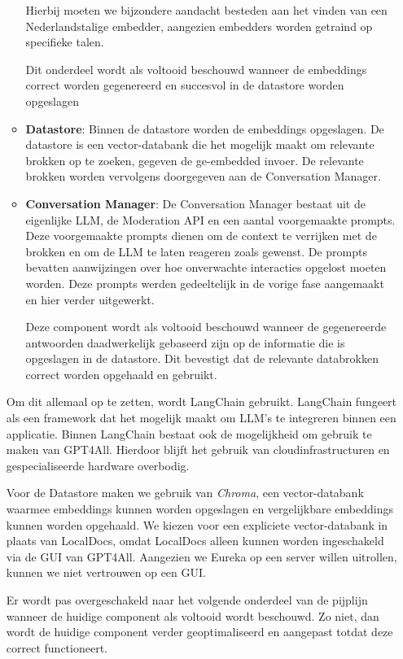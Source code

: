 \begin{enumerate}
\begin{itemize}
        Hierbij moeten we bijzondere aandacht besteden aan het vinden van een Nederlandstalige embedder, aangezien embedders worden getraind op specifieke talen.

        Dit onderdeel wordt als voltooid beschouwd wanneer de embeddings correct worden gegenereerd en succesvol in de datastore worden opgeslagen
        \item \textbf{Datastore}: Binnen de datastore worden de embeddings opgeslagen. De datastore is een vector-databank die het mogelijk maakt om relevante brokken op te zoeken, gegeven de ge-embedded invoer. De relevante brokken worden vervolgens doorgegeven aan de Conversation Manager. 
        \item \textbf{Conversation Manager}: De Conversation Manager bestaat uit de eigenlijke \acrshort{LLM}, de Moderation API en een aantal voorgemaakte prompts. Deze voorgemaakte prompts dienen om de context te verrijken met de brokken en om de \acrshort{LLM} te laten reageren zoals gewenst. De prompts bevatten aanwijzingen over hoe onverwachte interacties opgelost moeten worden. Deze prompts werden gedeeltelijk in de vorige fase aangemaakt en hier verder uitgewerkt. 
        
        Deze component wordt als voltooid beschouwd wanneer de gegenereerde antwoorden daadwerkelijk gebaseerd zijn op de informatie die is opgeslagen in de datastore. Dit bevestigt dat de relevante databrokken correct worden opgehaald en gebruikt.
    \end{itemize}
    
    Om dit allemaal op te zetten, wordt LangChain gebruikt. LangChain fungeert als een framework dat het mogelijk maakt om \acrshort{LLM}’s te integreren binnen een applicatie. Binnen LangChain bestaat ook de mogelijkheid om gebruik te maken van GPT4All. Hierdoor blijft het gebruik van cloudinfrastructuren en gespecialiseerde hardware overbodig.
    
    Voor de Datastore maken we gebruik van \textit{Chroma}, een vector-databank waarmee embeddings kunnen worden opgeslagen en vergelijkbare embeddings kunnen worden opgehaald. We kiezen voor een expliciete vector-databank in plaats van LocalDocs, omdat LocalDocs alleen kunnen worden ingeschakeld via de GUI van GPT4All. Aangezien we Eureka op een server willen uitrollen, kunnen we niet vertrouwen op een GUI.
    
    Er wordt pas overgeschakeld naar het volgende onderdeel van de pijplijn wanneer de huidige component als voltooid wordt beschouwd. Zo niet, dan wordt de huidige component verder geoptimaliseerd en aangepast totdat deze correct functioneert.
    

\end{enumerate}
